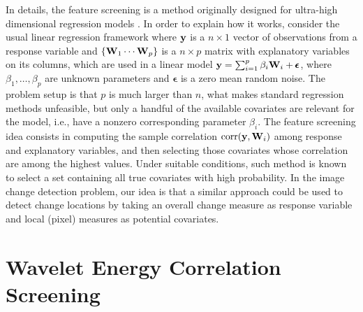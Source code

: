 \documentclass[journal]{IEEEtran}
\newcommand{\vepsilon}{\pmb{\epsilon}}
\newcommand{\vW}{{\textbf W}}
\newcommand{\vy}{{\textbf y}}
\begin{document}

In details, the feature screening is a method originally designed for ultra-high dimensional regression models \cite{fan2008sure}. In order to explain how it works, consider the usual linear regression framework where $\vy$ is a $n\times 1$ vector of observations from a response variable and $\{\vW_1 \cdots \vW_p\}$ is a $n\times p$ matrix with explanatory variables on its columns, which are used in a linear model $\vy = \sum_{i=1}^{p}\beta_i\vW_i + \vepsilon$, where $\beta_1,\ldots,\beta_p$ are unknown parameters and $\vepsilon$ is a zero mean random noise. The problem setup is that $p$ is much larger than $n$, what makes standard regression methods unfeasible, but only a handful of the available covariates are relevant for the model, i.e., have a nonzero corresponding parameter $\beta_i$. The feature screening idea consists in computing the sample correlation $\mathrm{corr}(\vy,\vW_i)$ among response and explanatory variables, and then selecting those covariates whose correlation are among the highest values. Under suitable conditions, such method is known to select a set containing all true covariates with high probability. In the image change detection problem, our idea is that a similar approach could be used to detect change locations by taking an overall change measure as response variable and local (pixel) measures as potential covariates.



\section{Wavelet Energy Correlation Screening}\label{section_method}
\end{document}
